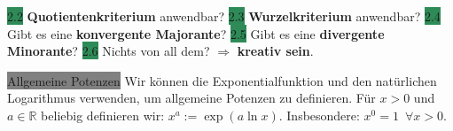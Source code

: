 \documentclass[landscape, 10pt]{article}
\newcommand{\R}{\mathbb{R}}
\begin{document}
\begin{multicols}{3}
         \colorbox{SeaGreen}{2.2} \textbf{Quotientenkriterium} anwendbar?
         \colorbox{SeaGreen}{2.3} \textbf{Wurzelkriterium} anwendbar?
         \colorbox{SeaGreen}{2.4} Gibt es eine \textbf{konvergente Majorante}?
         \colorbox{SeaGreen}{2.5} Gibt es eine \textbf{divergente Minorante}?
         \colorbox{SeaGreen}{2.6} Nichts von all dem?
                $\Longrightarrow$ \textbf{kreativ sein}.





\colorbox{gray}{Allgemeine Potenzen} Wir können die Exponentialfunktion
                und den natürlichen Logarithmus verwenden, um 
         allgemeine Potenzen zu definieren. Für $x>0$ und
                $a\in\R$ beliebig definieren wir:
                $x^a:=\exp(a\ln x)$. 
         Insbesondere: $x^0=1\enspace\forall x>0$.


\end{multicols}
\end{document}
